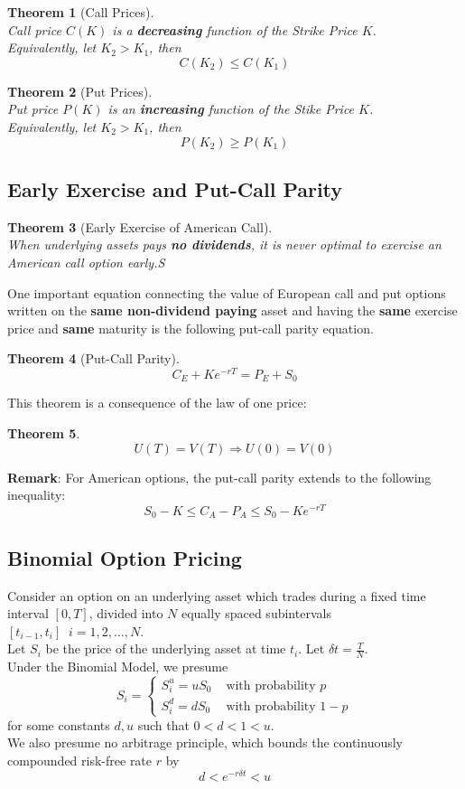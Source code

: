 \documentclass[12pt]{article}
\newtheorem{theorem}{Theorem}[section]
\theoremstyle{definition}
\begin{document}
\begin{theorem}[Call Prices]
\hfill\\\normalfont Call price $C(K)$ is a \textbf{decreasing} function of the Strike Price $K$. \\Equivalently, let $K_2>K_1$, then
\[
C(K_2)\leq C(K_1)
\]  
\end{theorem}
\begin{theorem}[Put Prices]
\hfill\\\normalfont Put price $P(K)$ is an \textbf{increasing} function of the Stike Price $K$.\\Equivalently, let $K_2>K_1$, then
\[
P(K_2)\geq P(K_1)
\]
\end{theorem}
\subsection{Early Exercise and Put-Call Parity}
\begin{theorem}[Early Exercise of American Call]
\hfill\\\normalfont When underlying assets pays \textbf{no dividends}, it is never optimal to exercise an American call option early.S
\end{theorem}
One important equation connecting the value of European call and put options written on the \textbf{same non-dividend paying} asset and having the \textbf{same} exercise price and \textbf{same} maturity is the following put-call parity equation. 
\begin{theorem}[Put-Call Parity]
\hfill\\\normalfont 
\[
C_E+Ke^{-rT}=P_E+S_0
\]
\end{theorem}
This theorem is a consequence of the law of one price:
\begin{theorem}
\hfill\\\normalfont 
\[
U(T)=V(T)\Rightarrow U(0)=V(0)
\]
\end{theorem}
\textbf{Remark}: For American options, the put-call parity extends to the following inequality:
\[
S_0-K\leq C_A-P_A\leq S_0-Ke^{-rT}
\]
\subsection{Binomial Option Pricing}
Consider an option on an underlying asset which trades during a fixed time interval $[0,T]$, divided into $N$ equally spaced subintervals $[t_{i-1}, t_i]\;\; i=1,2,\ldots, N$.\\
Let $S_i$ be the price of the underlying asset at time $t_i$. Let $\delta t = \frac{T}{N}$.\\
Under the Binomial Model, we presume
\[
S_i = \begin{cases}
S_i^u=uS_0&\text{ with probability }p\\
S_i^d = dS_0&\text{ with probability }1-p
\end{cases}
\]
for some constants $d, u$ such that $0<d<1<u$.\\
We also presume no arbitrage principle, which bounds the continuously compounded risk-free rate $r$ by
\[
d<e^{-r\delta t}<u
\]
\end{document}
